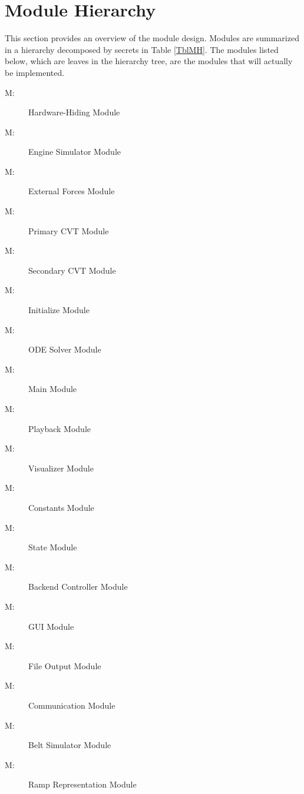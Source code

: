 \documentclass[12pt, titlepage]{article}
\newcounter{mnum}
\newcommand{\mthemnum}{M\themnum}
\begin{document}
\section{Module Hierarchy} \label{SecMH}

This section provides an overview of the module design. Modules are summarized
in a hierarchy decomposed by secrets in Table \ref{TblMH}. The modules listed
below, which are leaves in the hierarchy tree, are the modules that will
actually be implemented.

\begin{description}
  \item [ \mthemnum \label{mHH}:] Hardware-Hiding Module
  \item [ \mthemnum \label{mEngineSim}:] Engine Simulator Module
  \item [ \mthemnum \label{mExternalForces}:] External Forces Module
  \item [ \mthemnum \label{mPrimCVT}:] Primary CVT Module
  \item [ \mthemnum \label{mSecCVT}:] Secondary CVT Module
  \item [ \mthemnum \label{mInitialize}:] Initialize Module
  \item [ \mthemnum \label{mODESolver}:] ODE Solver Module
  \item [ \mthemnum \label{mMain}:] Main Module
  \item [ \mthemnum \label{mPlayback}:] Playback Module
  \item [ \mthemnum \label{mVisualizer}:] Visualizer Module
  \item [ \mthemnum \label{mConstants}:] Constants Module
  \item [ \mthemnum \label{mState}:] State Module
  \item [ \mthemnum \label{mBCM}:] Backend Controller Module
  \item [ \mthemnum \label{mGUI}:] GUI Module
  \item [ \mthemnum \label{mFileOutput}:] File Output Module
  \item [ \mthemnum \label{mComm}:] Communication Module
  \item [ \mthemnum \label{mBeltSim}:] Belt Simulator Module
  \item [ \mthemnum \label{mRampRep}:] Ramp Representation Module
  \end{description}
\end{document}
